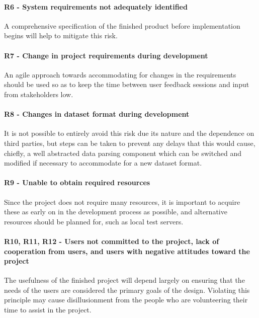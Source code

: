\paragraph{R6 - System requirements not adequately identified} A
comprehensive specification of the finished product before
implementation begins will help to mitigate this risk.

\paragraph{R7 - Change in project requirements during development}
An agile approach towards accommodating for changes in the
requirements should be used so as to keep the time between user
feedback sessions and input from stakeholders low.

\paragraph{R8 - Changes in dataset format during development} It is
not possible to entirely avoid this risk due its nature and the
dependence on third parties, but steps can be taken to prevent any
delays that this would cause, chiefly, a well abstracted data parsing
component which can be switched and modified if necessary to
accommodate for a new dataset format.

\paragraph{R9 - Unable to obtain required resources} Since the
project does not require many resources, it is important to acquire
these as early on in the development process as possible, and
alternative resources should be planned for, such as local test
servers.

\paragraph{R10, R11, R12 - Users not committed to the project, lack
of cooperation from users, and users with negative attitudes toward
the project} The usefulness of the finished project will depend
largely on ensuring that the needs of the users are considered the
primary goals of the design. Violating this principle may cause
disillusionment from the people who are volunteering their time to
assist in the project.
